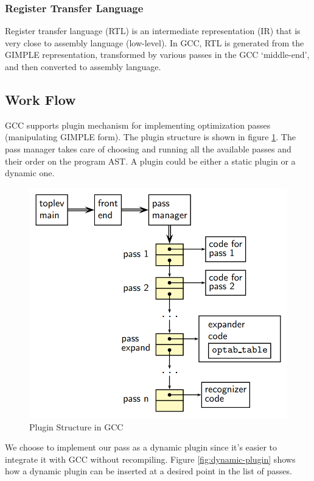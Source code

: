 \subsubsection{Register Transfer Language}
Register transfer language (RTL)\cite{rtl} is an intermediate representation (IR) that is very close to assembly language (low-level). In GCC, RTL is generated from the GIMPLE representation, transformed by various passes in the GCC `middle-end', and then converted to assembly language.

\subsection{Work Flow}
GCC supports plugin mechanism for implementing optimization passes (manipulating GIMPLE form). The plugin structure is shown in figure \ref{fig:plugin}. The pass manager takes care of choosing and running all the available passes and their order on the program AST. A plugin could be either a static plugin or a dynamic one.
\begin{figure}[htb]
\centering
\includegraphics[scale=0.7]{./plugin1}
\caption{Plugin Structure in GCC\cite{grc}}
\label{fig:plugin}
\end{figure}

\pagebreak
We choose to implement our pass as a dynamic plugin since it's easier to integrate it with GCC without recompiling. Figure \ref{fig:dynamic-plugin} shows how a dynamic plugin can be inserted at a desired point in the list of passes.

